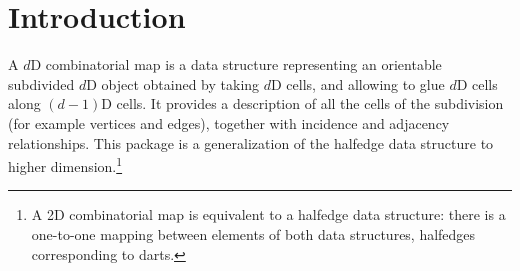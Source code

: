 \def\ccTagRmTrailingConst{\ccFalse}

\newcommand{\mb}[1]{\beta_{#1}}
\newcommand{\orb}[1]{\langle{}#1\rangle{}}
\newcommand{\nulldart}{\texttt{null\_dart\_handle}}

\section{Introduction}
A $d$D combinatorial map is a data structure representing an
orientable subdivided $d$D %
object obtained by taking $d$D cells, and allowing to glue $d$D cells
along $(d-1)$D cells.  It provides a description of all the cells of
the subdivision (for example vertices and edges), together with incidence
and adjacency relationships. This package is a generalization of the
halfedge data structure to higher dimension.\footnote{A 2D
  combinatorial map is equivalent to a halfedge data structure: there
  is a one-to-one mapping between elements of both data structures,
  halfedges corresponding to darts.}

